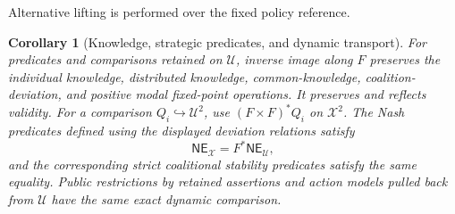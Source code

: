 \documentclass[11pt,a4paper]{article}
\numberwithin{equation}{section}
\newtheorem{corollary}[theorem]{Corollary}
\theoremstyle{definition}
\theoremstyle{remark}
\theoremstyle{plain}
\begin{document}
\noindent Alternative lifting is performed over the fixed policy reference.
\begin{center}
\end{center}

\begin{corollary}[Knowledge, strategic predicates, and dynamic transport]
\label{cor:egt-announcement-policy-logic}
For predicates and comparisons retained on $\mathcal U$, inverse image
along $F$ preserves the individual knowledge, distributed knowledge,
common-knowledge, coalition-deviation, and positive modal fixed-point
operations. It preserves and reflects validity. For a comparison
$Q_i\hookrightarrow\mathcal U^2$, use
$(F\times F)^*Q_i$ on $\mathcal X^2$. The Nash predicates defined using the
displayed deviation relations satisfy
\[
 \mathsf{NE}_{\mathcal X}=F^*\mathsf{NE}_{\mathcal U},
\]
and the corresponding strict coalitional stability predicates satisfy the
same equality. Public restrictions by retained assertions and action models
pulled back from $\mathcal U$ have the same exact dynamic comparison.
\end{corollary}
\end{document}
